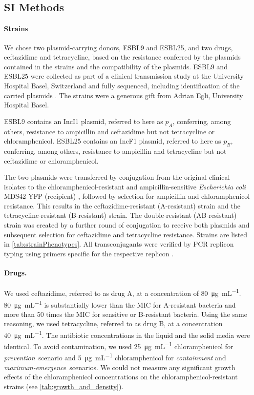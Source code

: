 \subsection{SI Methods\label{ssec:si_methods}}

\paragraph{Strains}
We chose two plasmid-carrying donors, ESBL9 and ESBL25, and two drugs, ceftazidime and tetracycline, based on the resistance conferred by the plasmids contained in the strains and the compatibility of the plasmids. 
ESBL9 and ESBL25 were collected as part of a clinical transmission study at the University Hospital Basel, Switzerland \cite{Sutter2016} and fully sequenced, including identification of the carried plasmids \cite{Huisman2022}. 
The strains were a generous gift from Adrian Egli, University Hospital Basel.

ESBL9 contains an IncI1 plasmid, referred to here as $p_A$, conferring, among others, resistance to ampicillin and ceftazidime but not tetracycline or chloramphenicol. 
ESBL25 contains an IncF1 plasmid, referred to here as $p_B$, conferring, among others, resistance to ampicillin and tetracycline but not ceftazidime or chloramphenicol.

The two plasmids were transferred by conjugation from the original clinical isolates to the chloramphenicol-resistant and ampicillin-sensitive \textit{Escherichia coli} MDS42-YFP (recipient) \cite{Feher2012}, followed by selection for ampicillin and chloramphenicol resistance.
This results in the ceftazidime-resistant (A-resistant) strain and the tetracycline-resistant (B-resistant) strain. 
The double-resistant (AB-resistant) strain was created by a further round of conjugation to receive both plasmids and subsequent selection for ceftazidime and tetracycline resistance. 
Strains are listed in \autoref{tab:strainPhenotypes}.
All transconjugants were verified by PCR replicon typing using primers specific for the respective replicon \cite{Carattoli2005}. 

\paragraph{Drugs.}
We used ceftazidime, referred to as drug A, at a concentration of \SI{80}{\micro\gram\per\milli\liter}. 
\SI{80}{\micro\gram\per\milli\liter} is substantially lower than the MIC for A-resistant bacteria and more than 50 times the MIC for sensitive or B-resistant bacteria. 
Using the same reasoning, we used tetracycline, referred to as drug B, at a concentration \SI{40}{\micro\gram\per\milli\liter}. 
The antibiotic concentrations in the liquid and the solid media were identical. 
To avoid contamination, we used \SI{25}{\micro\gram\per\milli\liter} chloramphenicol for \textit{prevention}~scenario and \SI{5}{\micro\gram\per\milli\liter} chloramphenicol for \textit{containment} and \textit{maximum-emergence}~scenarios. 
We could not measure any significant growth effects of the chloramphenicol concentrations on the chloramphenicol-resistant strains (see \autoref{tab:growth_and_density}).



